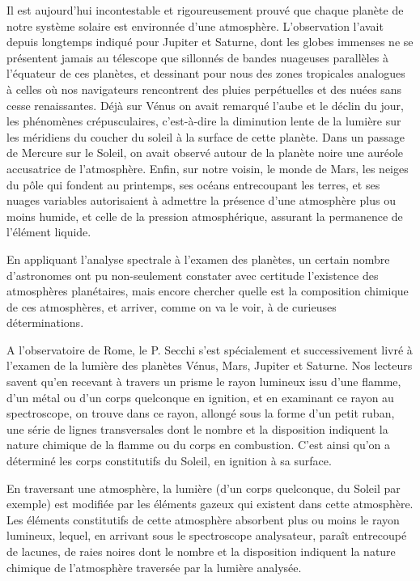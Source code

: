 \documentclass[a4paper, 11pt, oneside]{article}
\begin{document}
Il est aujourd'hui incontestable et rigoureusement prouvé que chaque planète de notre système solaire est environnée d'une atmosphère. L'observation l'avait depuis longtemps indiqué pour Jupiter et Saturne, dont les globes immenses ne se présentent jamais au télescope que sillonnés de bandes nuageuses parallèles à l'équateur de ces planètes, et dessinant pour nous des zones tropicales analogues à celles où nos navigateurs rencontrent des pluies perpétuelles et des nuées sans cesse renaissantes. Déjà sur Vénus on avait remarqué l'aube et le déclin du jour, les phénomènes crépusculaires, c'est-à-dire la diminution lente de la lumière sur les méridiens du coucher du soleil à la surface de cette planète. Dans un passage de Mercure sur le Soleil, on avait observé autour de la planète noire une auréole accusatrice de l'atmosphère. Enfin, sur notre voisin, le monde de Mars, les neiges du pôle qui fondent au printemps, ses océans entrecoupant les terres, et ses nuages variables autorisaient à admettre la présence d'une atmosphère plus ou moins humide, et celle de la pression atmosphérique, assurant la permanence de l'élément liquide.

En appliquant l'analyse spectrale à l'examen des planètes, un certain nombre d'astronomes ont pu non-seulement constater avec certitude l'existence des atmosphères planétaires, mais encore chercher quelle est la composition chimique de ces atmosphères, et arriver, comme on va le voir, à de curieuses déterminations.

A l'observatoire de Rome, le P. Secchi s'est spécialement et successivement livré à l'examen de la lumière des planètes Vénus, Mars, Jupiter et Saturne. Nos lecteurs savent qu'en recevant à travers un prisme le rayon lumineux issu d'une flamme, d'un métal ou d'un corps quelconque en ignition, et en examinant ce rayon au spectroscope, on trouve dans ce rayon, allongé sous la forme d'un petit ruban, une série de lignes transversales dont le nombre et la disposition indiquent la nature chimique de la flamme ou du corps en combustion. C'est ainsi qu'on a déterminé les corps constitutifs du Soleil, en ignition à sa surface.

En traversant une atmosphère, la lumière (d'un corps quelconque, du Soleil par exemple) est modifiée par les éléments gazeux qui existent dans cette atmosphère. Les éléments constitutifs de cette atmosphère absorbent plus ou moins le rayon lumineux, lequel, en arrivant sous le spectroscope analysateur, paraît entrecoupé de lacunes, de raies noires dont le nombre et la disposition indiquent la nature chimique de l'atmosphère traversée par la lumière analysée.
\end{document}
